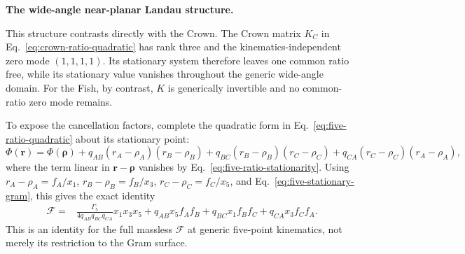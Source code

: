 \documentclass[a4paper,11pt]{article}
\begin{document}
\medskip
\noindent\textbf{The wide-angle near-planar Landau structure.}\par\smallskip

This structure contrasts directly with the Crown.  The Crown matrix
\(K_C\) in Eq.~\eqref{eq:crown-ratio-quadratic} has rank three and the
kinematics-independent zero mode \((1,1,1,1)\).  Its stationary system
therefore leaves one common ratio free, while its stationary value vanishes
throughout the generic wide-angle domain.  For the Fish, by contrast,
\(K\) is generically invertible and no common-ratio zero mode remains.

To expose the cancellation factors, complete the quadratic form in
Eq.~\eqref{eq:five-ratio-quadratic} about its stationary point:
\[
 \Phi(\boldsymbol r)=\Phi(\boldsymbol\rho)
 +q_{AB}(r_A-\rho_A)(r_B-\rho_B)
 +q_{BC}(r_B-\rho_B)(r_C-\rho_C)
 +q_{CA}(r_C-\rho_C)(r_A-\rho_A),
\]
where the term linear in \(\boldsymbol r-\boldsymbol\rho\) vanishes by
Eq.~\eqref{eq:five-ratio-stationarity}.  Using
\(r_A-\rho_A=f_A/x_1\), \(r_B-\rho_B=f_B/x_3\),
\(r_C-\rho_C=f_C/x_5\), and Eq.~\eqref{eq:five-stationary-gram}, this gives
the exact identity
\begin{align}
 \mathcal F={}&\frac{\Gamma_5}{4q_{AB}q_{BC}q_{CA}}x_1x_3x_5
 +q_{AB}x_5f_Af_B+q_{BC}x_1f_Bf_C+q_{CA}x_3f_Cf_A.
 \label{eq:five-full-stationary-decomposition}
\end{align}
This is an identity for the full massless \(\mathcal F\) at generic
five-point kinematics, not merely its restriction to the Gram surface.
\end{document}
